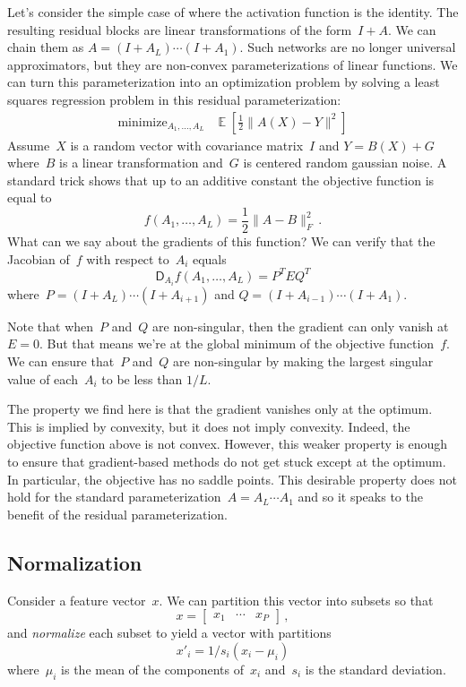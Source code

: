 \documentclass{tufte-book}
\begin{document}
Let's consider the simple case of where the activation function is the
identity. The resulting residual blocks are linear transformations of
the form~\(I + A.\) We can chain them as
\(A=(I + A_L)\cdots (I + A_1).\) Such networks are no longer universal
approximators, but they are non-convex parameterizations of linear
functions. We can turn this parameterization into an optimization
problem by solving a least squares regression problem in this residual
parameterization: \[
\begin{array}{ll}
    \text{minimize}_{A_1,\dots,A_L}  & \mathop\mathbb{E}[\frac12\|A(X)-Y\|^2]
\end{array}
\] Assume~\(X\) is a random vector with covariance matrix~\(I\) and
\(Y=B(X)+G\) where~\(B\) is a linear transformation and~\(G\) is
centered random gaussian noise. A standard trick shows that up to an
additive constant the objective function is equal to \[
f(A_1,\dots,A_L)=\frac12\|A-B\|_F^2\,.
\] What can we say about the gradients of this function? We can verify
that the Jacobian of~\(f\) with respect to~\(A_i\) equals \[
\mathsf{D}_{A_i} f(A_1,\dots, A_L)
= P^T E Q^T
\] where~\(P=(I+A_L)\cdots(I+A_{i+1})\) and
\(Q=(I + A_{i-1})\cdots(I + A_1).\)

Note that when~\(P\) and~\(Q\) are non-singular, then the gradient can
only vanish at~\(E=0\). But that means we're at the global minimum of
the objective function~\(f\). We can ensure that~\(P\) and~\(Q\) are
non-singular by making the largest singular value of each~\(A_i\) to be
less than \(1/L\).

The property we find here is that the gradient vanishes only at the
optimum. This is implied by convexity, but it does not imply convexity.
Indeed, the objective function above is not convex. However, this weaker
property is enough to ensure that gradient-based methods do not get
stuck except at the optimum. In particular, the objective has no saddle
points. This desirable property does not hold for the standard
parameterization~\(A=A_L\cdots A_1\) and so it speaks to the benefit of
the residual parameterization.

\hypertarget{normalization}{%
\subsection{Normalization}\label{normalization}}

Consider a feature vector~\(x\). We can partition this vector into
subsets so that \[
x = \begin{bmatrix} x_1 & \cdots & x_P \end{bmatrix}\,,
\] and \emph{normalize} each subset to yield a vector with partitions \[
    x'_i = 1/s_i (x_i - \mu_i)
\] where~\(\mu_i\) is the mean of the components of~\(x_i\) and~\(s_i\)
is the standard deviation.
\end{document}
